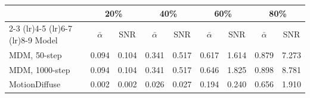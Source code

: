 \begin{tabular}{lcccccccc}
\toprule
& \multicolumn{2}{c}{20\%} & \multicolumn{2}{c}{40\%} & \multicolumn{2}{c}{60\%} & \multicolumn{2}{c}{80\%} \\
\cmidrule(lr){2-3} \cmidrule(lr){4-5} \cmidrule(lr){6-7} \cmidrule(lr){8-9}
Model & $\bar\alpha$ & SNR & $\bar\alpha$ & SNR & $\bar\alpha$ & SNR & $\bar\alpha$ & SNR \\
\midrule
MDM, 50-step & 0.094 & 0.104 & 0.341 & 0.517 & 0.617 & 1.614 & 0.879 & 7.273 \\
MDM, 1000-step & 0.094 & 0.104 & 0.341 & 0.517 & 0.646 & 1.825 & 0.898 & 8.781 \\
MotionDiffuse & 0.002 & 0.002 & 0.026 & 0.027 & 0.194 & 0.240 & 0.656 & 1.910 \\
\bottomrule
\end{tabular}
